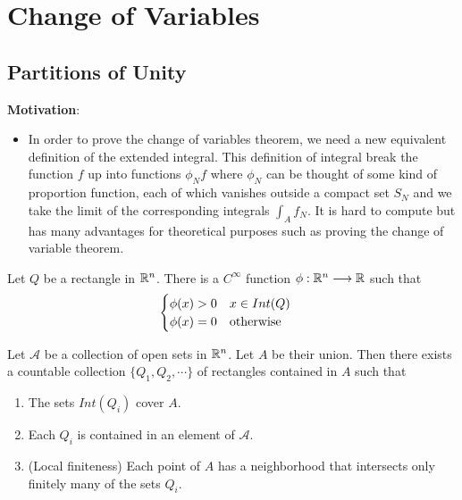 \chapter{Change of Variables}

\section{Partitions of Unity}

\noindent \textbf{Motivation}:
\begin{itemize}
    \item In order to prove the change of variables theorem, we need a new equivalent definition of the extended integral.
    This definition of integral break the function $f$ up into functions $\phi_Nf$ where $\phi_N$ can be thought of some kind of proportion function, 
    each of which vanishes outside a compact set $S_N$ and we take the limit of the corresponding integrals $\int_Af_N$. It is hard to compute but has many advantages for theoretical purposes such as proving the change of variable theorem.
\end{itemize}

\begin{lemma}
    Let $Q$ be a rectangle in $\mathbb{R}^n$. There is a $C^{\infty}$ function $\phi:\mathbb{R}^n\longrightarrow\mathbb{R}$ such that 
    \begin{equation*}
        \begin{cases}
            \phi(x)>0\text{\quad}x\in Int(Q)\\
            \phi(x)=0\text{\quad otherwise}
        \end{cases}
    \end{equation*}
\end{lemma}

\begin{lemma}
    Let $\mathcal{A}$ be a collection of open sets in $\mathbb{R}^n$. Let $A$ be their union. Then there exists a countable collection $\{Q_1,Q_2,\cdots\}$ of rectangles contained in $A$ such that
    \begin{enumerate}
        \item The sets $Int(Q_i)$ cover $A$.
        \item Each $Q_i$ is contained in an element of $\mathcal{A}$.
        \item (Local finiteness) Each point of $A$ has a neighborhood that intersects only finitely many of the sets $Q_i$.
    \end{enumerate}
\end{lemma}

